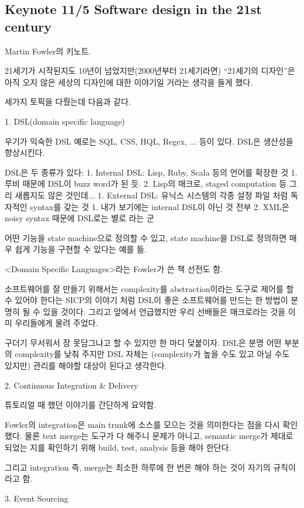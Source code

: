 \documentclass[a4paper]{article}
\begin{document}
\subsection{Keynote 11/5 Software design in the 21st century}
 
Martin Fowler의 키노트.
 
21세기가 시작된지도 10년이 넘었지만(2000년부터 21세기라면) “21세기의
디자인”은 아직 오지 않은 세상의 디자인에 대한 이야기일 거라는 생각을
들게 했다.
 
세가지 토픽을 다뤘는데 다음과 같다.
 
1. DSL(domain specific language)
 
우기가 익숙한 DSL 예로는 SQL, CSS, HQL, Regex, ... 등이 있다. DSL은 생산성을 향상시킨다.
 
DSL은 두 종류가 있다:
1. Internal DSL: Lisp, Ruby, Scala  등의 언어를 확장한 것
1. 루비 때문에 DSL이 buzz word가 된 듯.
2. Lisp의 매크로, staged computation 등 그리 새롭지도 않은 것인데...
1. External DSL: 유닉스 시스템의 각종 설정 파일 처럼 독자적인  syntax를 갖는 것
1. 내가 보기에는 internal DSL이 아닌 것 전부
2. XML은 noisy syntax 때문에 DSL로는 별로 라는 군
 
어떤 기능을 state machine으로 정의할 수 있고, state machine을 DSL로 정의하면 매우 쉽게 기능을 구현할 수 있다는 예를 듦.
 
<Domain Specific Languages>라는 Fowler가 쓴 책 선전도 함.
 
소프트웨어를 잘 만들기 위해서는 complexity를 abstraction이라는 도구로
제어를 할 수 있어야 한다는 SICP의 이야기 처럼 DSL이 좋은 소프트웨어를
만드는 한 방법이 분명히 될 수 있을 것이다. 그리고 앞에서 언급했지만
우리 선배들은 매크로라는 것을 이미 우리들에게 물려 주었다.
 
구더기 무서워서 장 못담그냐고 할 수 있지만 한 마디 덪붙이자. DSL은 분명
어떤 부분의 complexity를 낮춰 주지만 DSL 자체는 (complexity가 높을 수도
있고 아닐 수도 있지만) 관리를 해야할 대상이 된다고 생각한다.
 
2. Continuous Integration \& Delivery
 
튜토리얼 때 했던 이야기를 간단하게 요약함. 
 
Fowler의 integration은 main trunk에 소스를 모으는 것을 의미한다는 점을
다시 확인했다.  물론 text merge는 도구가 다 해주니 문제가 아니고,
semantic merge가 제대로 되었는 지를 확인하기 위해 build, test,
analysis 등을 해야 한단다.
 
그리고 integration 즉, merge는 최소한 하루에 한 번은 해야 하는 것이
자기의 규칙이라고 함.
 
3. Event Sourcing
 
\end{document}

